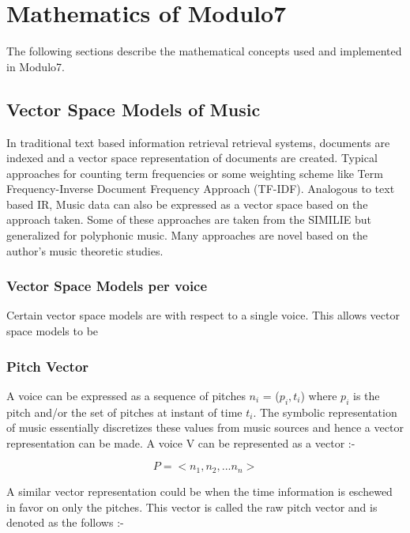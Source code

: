 \chapter{Mathematics of Modulo7}
\label{sec:mir math}

\noindent The following sections describe the mathematical concepts used and implemented in Modulo7.

\section{Vector Space Models of Music}

\noindent In traditional text based information retrieval retrieval systems, documents are indexed and a vector space representation of documents are created. Typical approaches for counting term frequencies or some weighting scheme like Term Frequency-Inverse Document Frequency Approach (TF-IDF). Analogous to text based IR, Music data can also be expressed as a vector space based on the approach taken. Some of these approaches are taken from the SIMILIE \cite{similietechnicalmanual} but generalized for polyphonic music. Many approaches are novel based on the author's music theoretic studies. 

\subsection{Vector Space Models per voice}

Certain vector space models are with respect to a single voice. This allows vector space models to be 

\subsection{Pitch Vector}

\noindent A voice can be expressed as a sequence of pitches $n_i$ = ($p_i, t_i$) where $p_i$ is the pitch and/or the set of pitches at instant of time $t_i$. The symbolic representation of music essentially discretizes these values from music sources and hence a vector representation can be made. A voice V can be represented as a vector :-

\begin{equation}
P = <n_1, n_2, ... n_n>
\end{equation}

\noindent A similar vector representation could be when the time information is eschewed in favor on only the pitches. This vector is called the raw pitch vector and is denoted as the follows :-

